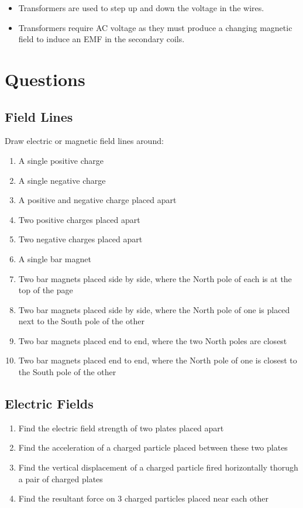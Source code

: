 \documentclass[a4paper,11pt]{report}
\begin{document}
\begin{itemize}
\item Transformers are used to step up and down the voltage in the wires.
\item Transformers require AC voltage as they must produce a changing magnetic
	field to induce an EMF in the secondary coils.
\end{itemize}


\section{Questions}

\subsection{Field Lines}

Draw electric or magnetic field lines around:

\begin{enumerate}
\item A single positive charge
\item A single negative charge
\item A positive and negative charge placed apart
\item Two positive charges placed apart
\item Two negative charges placed apart
\item A single bar magnet
\item Two bar magnets placed side by side, where the North pole of each is at
	the top of the page
\item Two bar magnets placed side by side, where the North pole of one is placed
	next to the South pole of the other
\item Two bar magnets placed end to end, where the two North poles are closest
\item Two bar magnets placed end to end, where the North pole of one is closest
	to the South pole of the other
\end{enumerate}

\subsection{Electric Fields}

\begin{enumerate}
\item Find the electric field strength of two plates placed apart
\item Find the acceleration of a charged particle placed between these two
	plates
\item Find the vertical displacement of a charged particle fired horizontally
	thorugh a pair of charged plates
\item Find the resultant force on 3 charged particles placed near each other
\end{enumerate}
\end{document}

